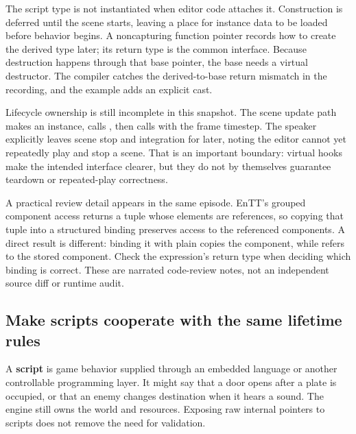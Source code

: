 The script type is not instantiated when editor code attaches it. Construction is deferred until the scene starts, leaving a place for instance data to be loaded before behavior begins. A noncapturing function pointer records how to create the derived type later; its return type is the common  interface. Because destruction happens through that base pointer, the base needs a virtual destructor. The compiler catches the derived-to-base return mismatch in the recording, and the example adds an explicit cast.

Lifecycle ownership is still incomplete in this snapshot. The scene update path makes an instance, calls , then calls  with the frame timestep. The speaker explicitly leaves scene stop and  integration for later, noting the editor cannot yet repeatedly play and stop a scene. That is an important boundary: virtual hooks make the intended interface clearer, but they do not by themselves guarantee teardown or repeated-play correctness.

A practical review detail appears in the same episode. EnTT's grouped component access returns a tuple whose elements are references, so copying that tuple into a structured binding preserves access to the referenced components. A direct  result is different: binding it with plain  copies the component, while  refers to the stored component. Check the expression's return type when deciding which binding is correct. These are narrated code-review notes, not an independent source diff or runtime audit.

\subsection{Make scripts cooperate with the same lifetime rules}\label{06-engine-ii-ch040-make-scripts-cooperate-with-the-same-lifetime-rules}

\hypertarget{06-engine-ii-ch040-make-scripts-cooperate-with-the-same-lifetime-rules}{}

A \textbf{script} is game behavior supplied through an embedded language or another controllable programming layer. It might say that a door opens after a plate is occupied, or that an enemy changes destination when it hears a sound. The engine still owns the world and resources. Exposing raw internal pointers to scripts does not remove the need for validation.

